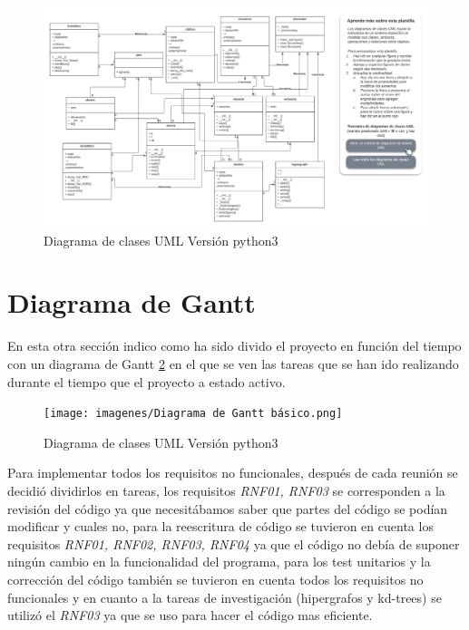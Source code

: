 \documentclass{cosas/tfg_domingo}
\begin{document}
\begin{figure}[ht!] %
\begin{center}
\includegraphics[width=1.42\linewidth]{imagenes/python3 - Clase UML.png}
\end{center}
\caption{Diagrama de clases UML Versión python3}
\label{fig_UML3}
\end{figure}

\newpage

\section{Diagrama de Gantt}

En esta otra sección indico como ha sido divido el proyecto en función del tiempo con un diagrama de Gantt \ref{fig_GANTT} en el que se ven las tareas que se han ido realizando durante el tiempo que el proyecto a estado activo.

\begin{figure}[ht!] %
\begin{center}
\texttt{[image: imagenes/Diagrama de Gantt básico.png]}
\end{center}
\caption{Diagrama de clases UML Versión python3}
\label{fig_GANTT}
\end{figure}

Para implementar todos los requisitos no funcionales, después de cada reunión se decidió dividirlos en tareas, los requisitos \textit{RNF01, RNF03} se corresponden a la revisión del código ya que necesitábamos saber que partes del código se podían modificar y cuales no, para la reescritura de código se tuvieron en cuenta los requisitos \textit{RNF01, RNF02, RNF03, RNF04} ya que el código no debía de suponer ningún cambio en la funcionalidad del programa,  para los test unitarios y la corrección del código también se tuvieron en cuenta todos los requisitos no funcionales y en cuanto a la tareas de investigación (hipergrafos y kd-trees) se utilizó el \textit{RNF03} ya que se uso para hacer el código mas eficiente.
\end{document}
